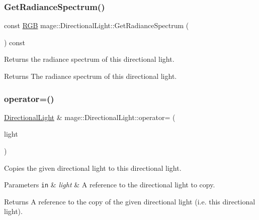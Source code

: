 \subsubsection{\texorpdfstring{Get\+Radiance\+Spectrum()}{GetRadianceSpectrum()}}
{\footnotesize\ttfamily const \hyperlink{structmage_1_1_r_g_b}{R\+GB} mage\+::\+Directional\+Light\+::\+Get\+Radiance\+Spectrum (\begin{DoxyParamCaption}{ }\end{DoxyParamCaption}) const\hspace{0.3cm}{\ttfamily [noexcept]}}

Returns the radiance spectrum of this directional light.

\begin{DoxyReturn}{Returns}
The radiance spectrum of this directional light. 
\end{DoxyReturn}
\hypertarget{classmage_1_1_directional_light_a371d3c13d6e59c8d105da058b460874d}{}\label{classmage_1_1_directional_light_a371d3c13d6e59c8d105da058b460874d} 
\subsubsection{\texorpdfstring{operator=()}{operator=()}\hspace{0.1cm}{\footnotesize\ttfamily [1/2]}}
{\footnotesize\ttfamily \hyperlink{classmage_1_1_directional_light}{Directional\+Light} \& mage\+::\+Directional\+Light\+::operator= (\begin{DoxyParamCaption}\item[{const \hyperlink{classmage_1_1_directional_light}{Directional\+Light} \&}]{light }\end{DoxyParamCaption})\hspace{0.3cm}{\ttfamily [default]}}

Copies the given directional light to this directional light.


\begin{DoxyParams}[1]{Parameters}
\mbox{\tt in}  & {\em light} & A reference to the directional light to copy. \\
\hline
\end{DoxyParams}
\begin{DoxyReturn}{Returns}
A reference to the copy of the given directional light (i.\+e. this directional light). 
\end{DoxyReturn}
\hypertarget{classmage_1_1_directional_light_a508b595bf6aa5fc9db53e0a854fda41d}{}\label{classmage_1_1_directional_light_a508b595bf6aa5fc9db53e0a854fda41d} 
